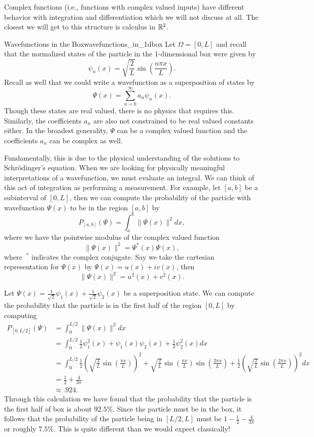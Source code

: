 \begin{remark}
	Complex functions (i.e., functions with complex valued inputs) have different behavior with integration and differentiation which we will not discuss at all.  The closest we will get to this structure is calculus in $\mathbb{R}^2$.
\end{remark}

\begin{ex}{Wavefunctions in the Box}{wavefunctions_in_1dbox}
	Let $\Omega=[0,L]$ and recall that the normalized states of the particle in the 1-dimensional box were given by
	\[
		\psi_n(x)=\sqrt{\frac{2}{L}} \sin\left(\frac{n \pi x}{L}\right).
	\]
	Recall as well that we could write a wavefunction as a superposition of states by
	\[
		\Psi(x)=\sum_{n=0}^\infty a_n \psi_n(x).
	\]
	Though these states are real valued, there is no physics that requires this.  Similarly, the coefficients $a_n$ are also not constrained to be real valued constants either.  In the broadest generality, $\Psi$ can be a complex valued function and the coefficients $a_n$ can be complex as well.

	Fundamentally, this is due to the physical understanding of the solutions to Schr\"odinger's equation. When we are looking for physically meaningful interpretations of a wavefunction, we must evaluate an integral. We can think of this act of integration as performing a measurement.  For example, let $[a,b]$ be a subinterval of $[0,L]$, then we can compute the probability of the particle with wavefunction $\Psi(x)$ to be in the region $[a,b]$ by 
	\[
		P_{[a,b]}(\Psi) = \int_a^b \|\Psi(x)\|^2dx,
	\]
	where we have the pointwise modulus of the complex valued function
	\[
		\|\Psi(x)\|^2 = \Psi^*(x)\Psi(x),
	\]
	where $~^*$ indicates the complex conjugate.  Say we take the cartesian representation for $\Psi(x)$ by $\Psi(x)=u(x)+iv(x)$, then
	\[
		\|\Psi(x)\|^2 = u^2(x)+v^2(x).
	\]
	
	Let $\Psi(x)=\frac{1}{\sqrt{2}}\psi_1(x)+\frac{1}{\sqrt{2}}\psi_2(x)$ be a superposition state.  We can compute the probability that the particle is in the first half of the region $[0,L]$ by computing
	\begin{align*}
		P_{[0,L/2]}(\Psi)&=\int_{0}^{L/2}  \|\Psi(x)\|^2 dx \\
			&=\int_{0}^{L/2} \frac{1}{2}\psi_1^2(x)+ \psi_1(x)\psi_2(x)+\frac{1}{2}\psi_2^2(x)dx\\
			&=\int_{0}^{L/2}\frac{1}{2} \left(\sqrt{\frac{2}{L}}\sin\left(\frac{\pi x}{L}\right)\right)^2 + \sqrt{\frac{2}{L}}\sin\left(\frac{\pi x}{L}\right)\sin\left(\frac{2\pi x}{L}\right)+ \frac{1}{2}\left(\sqrt{\frac{2}{L}}\sin\left(\frac{2\pi x}{L}\right)\right)^2dx\\
			&=\frac{1}{2}+\frac{4}{3\pi}\\
			&\approx .924.
	\end{align*}
	Through this calculation we have found that the probability that the particle is the first half of box is about $92.5\%$.  Since the particle must be in the box, it follows that the probability of the particle being in $[L/2,L]$ must be $1-\frac{1}{2}-\frac{4}{3\pi}$ or roughly $7.5\%$.  This is quite different than we would expect classically!


\end{ex}
